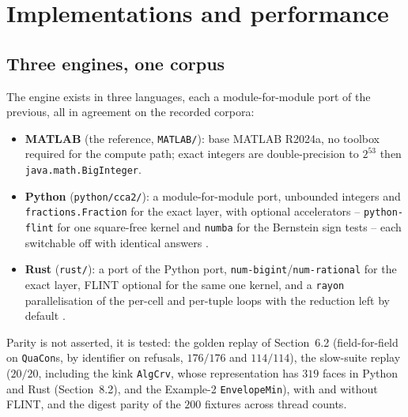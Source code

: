 \documentclass[11pt]{article}
\theoremstyle{definition}
\begin{document}
\section{Implementations and performance}

\subsection{Three engines, one corpus}

The engine exists in three languages, each a module-for-module port of the
previous, all in agreement on the recorded corpora:
\begin{itemize}[nosep,leftmargin=*]
\item \textbf{MATLAB} (the reference, \texttt{MATLAB/}): base MATLAB R2024a,
  no toolbox required for the compute path; exact integers are
  double-precision to $2^{53}$ then \texttt{java.math.BigInteger}.
\item \textbf{Python} (\texttt{python/cca2/}): a module-for-module port,
  unbounded integers and \texttt{fractions.Fraction} for the exact layer,
  with optional accelerators -- \texttt{python-flint} for one square-free
  kernel and \texttt{numba} for the Bernstein sign tests -- each switchable off
  with identical answers \cite{FLINT-26,NUMBA-20}.
\item \textbf{Rust} (\texttt{rust/}): a port of the Python port,
  \texttt{num-bigint}/\texttt{num-rational} for the exact layer, FLINT
  optional for the same one kernel, and a \texttt{rayon} parallelisation of
  the per-cell and per-tuple loops with the reduction left by default \cite{FLINT-26,RAYON-21}.
\end{itemize}

Parity is not asserted, it is tested: the golden replay of Section~6.2
(field-for-field on \texttt{QuaCon}s, by identifier on refusals, $176/176$ and
$114/114$), the slow-suite replay ($20/20$, including the kink \texttt{AlgCrv}, whose
representation has $319$ faces in Python and Rust (Section~8.2), and the Example-2
\texttt{EnvelopeMin}), with and without
FLINT,
and the digest parity of the
$200$ fixtures across thread counts.
\end{document}
